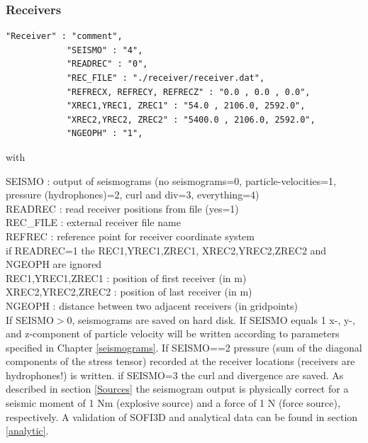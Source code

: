 \documentclass[11pt,onecolumn,oneside]{article}
\begin{document}
\subsubsection{Receivers}
\label{Receivers}
\begin{verbatim}
"Receiver" : "comment",
            "SEISMO" : "4",
            "READREC" : "0",
            "REC_FILE" : "./receiver/receiver.dat",
            "REFRECX, REFRECY, REFRECZ" : "0.0 , 0.0 , 0.0",
            "XREC1,YREC1, ZREC1" : "54.0 , 2106.0, 2592.0",
            "XREC2,YREC2, ZREC2" : "5400.0 , 2106.0, 2592.0",
            "NGEOPH" : "1",
\end{verbatim}

with 

SEISMO : output of seismograms (no seismograms=0, particle-velocities=1, pressure (hydrophones)=2, curl and div=3, everything=4)\\
READREC : read receiver positions from file (yes=1)\\
REC\_FILE : external receiver file name\\
REFREC : reference point for receiver coordinate system\\
if READREC=1 the REC1,YREC1,ZREC1, XREC2,YREC2,ZREC2 and NGEOPH are ignored\\ 
REC1,YREC1,ZREC1 : position of first receiver (in m)\\
XREC2,YREC2,ZREC2 : position of last receiver (in m)\\
NGEOPH : distance between two adjacent receivers (in gridpoints)\\


If SEISMO$>$0, seismograms are saved on hard disk. If SEISMO equals 1 x-, y-, and z-component of particle velocity will be written according to parameters specified in Chapter \ref{seismograms}.
If SEISMO==2 pressure (sum of the diagonal components of the stress tensor) recorded at the receiver locations (receivers are hydrophones!) is written. if SEISMO=3 the curl and divergence are saved. As described in section \ref{Sources} the seismogram output is physically correct for a seismic moment of 1 Nm (explosive source) and a force of 1 N (force source), respectively. A validation of SOFI3D and analytical data can be found in section \ref{analytic}.
\end{document}
